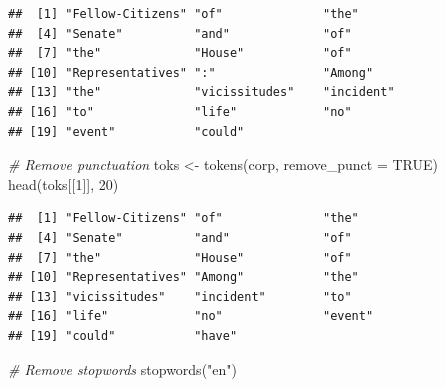 \documentclass[
  12pt,
]{style/krantz}
\newenvironment{Shaded}{\begin{snugshade}}{\end{snugshade}}
\newcommand{\AttributeTok}[1]{\textcolor[rgb]{0.77,0.63,0.00}{#1}}
\newcommand{\CommentTok}[1]{\textcolor[rgb]{0.56,0.35,0.01}{\textit{#1}}}
\newcommand{\ConstantTok}[1]{\textcolor[rgb]{0.00,0.00,0.00}{#1}}
\newcommand{\DecValTok}[1]{\textcolor[rgb]{0.00,0.00,0.81}{#1}}
\newcommand{\FunctionTok}[1]{\textcolor[rgb]{0.00,0.00,0.00}{#1}}
\newcommand{\NormalTok}[1]{#1}
\newcommand{\OtherTok}[1]{\textcolor[rgb]{0.56,0.35,0.01}{#1}}
\newcommand{\StringTok}[1]{\textcolor[rgb]{0.31,0.60,0.02}{#1}}
\begin{document}
\begin{verbatim}
##  [1] "Fellow-Citizens" "of"              "the"            
##  [4] "Senate"          "and"             "of"             
##  [7] "the"             "House"           "of"             
## [10] "Representatives" ":"               "Among"          
## [13] "the"             "vicissitudes"    "incident"       
## [16] "to"              "life"            "no"             
## [19] "event"           "could"
\end{verbatim}

\begin{Shaded}
\begin{Highlighting}[]
\CommentTok{\# Remove punctuation}
\NormalTok{toks }\OtherTok{\textless{}{-}} \FunctionTok{tokens}\NormalTok{(corp, }\AttributeTok{remove\_punct =} \ConstantTok{TRUE}\NormalTok{)}
\FunctionTok{head}\NormalTok{(toks[[}\DecValTok{1}\NormalTok{]], }\DecValTok{20}\NormalTok{)}
\end{Highlighting}
\end{Shaded}

\begin{verbatim}
##  [1] "Fellow-Citizens" "of"              "the"            
##  [4] "Senate"          "and"             "of"             
##  [7] "the"             "House"           "of"             
## [10] "Representatives" "Among"           "the"            
## [13] "vicissitudes"    "incident"        "to"             
## [16] "life"            "no"              "event"          
## [19] "could"           "have"
\end{verbatim}

\begin{Shaded}
\begin{Highlighting}[]
\CommentTok{\# Remove stopwords}
\FunctionTok{stopwords}\NormalTok{(}\StringTok{"en"}\NormalTok{)}
\end{Highlighting}
\end{Shaded}
\end{document}
